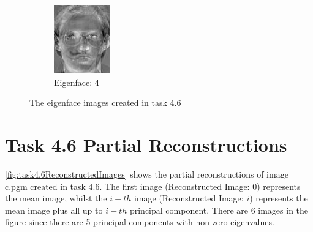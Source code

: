 \documentclass[12pt]{article}
\begin{document}
\begin{figure}
\begin{subfigure}[b]{0.20\textwidth}
		\includegraphics[width=\textwidth]{Task4.6_Images/PrincipalComponent4.jpg}
		\caption{Eigenface: 4}
	\end{subfigure}\quad
	\caption[Plots of eigenface images created in task 4.6]{\label{fig:task4.6Eigenfaces} The eigenface images created in task 4.6}
\end{figure}


\newpage
\thispagestyle{plain}
\mbox{}

\section {Task 4.6 Partial Reconstructions}
\label{sec:task4.6PartialReconstructions}

\cref{fig:task4.6ReconstructedImages} shows the partial reconstructions of image c.pgm created in task 4.6. The first image (Reconstructed Image: 0) represents the mean image, whilst the $i-th$ image (Reconstructed Image: $i$) represents the mean image plus all up to $i-th$ principal component. There are 6 images in the figure since there are 5 principal components with non-zero eigenvalues.
\end{document}
